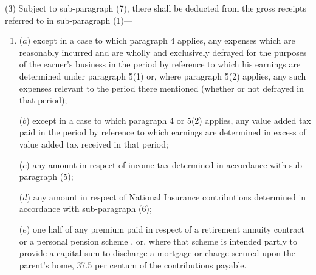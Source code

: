 \documentclass[a4paper]{article}
\begin{document}
(3) 
Subject to sub-paragraph (7), %
there shall be deducted from the gross receipts referred to in sub-paragraph (1)—
\begin{enumerate}\item[]
($a$) 
except in a case to which paragraph 4 applies, %
any expenses which are reasonably incurred and are wholly and exclusively defrayed for the purposes of the earner’s business in the period by reference to which his earnings are determined under paragraph 5(1) or, where paragraph 5(2) applies, any such expenses relevant to the period there mentioned (whether or not defrayed in that period);

($b$) 
except in a case to which paragraph 4 
  or 5(2)  %
applies, %
any value added tax paid in the period by reference to which earnings are determined in excess of value added tax received in that period;

($c$) any amount in respect of income tax determined in accordance with sub-paragraph (5);

($d$) any amount in respect of National Insurance contributions determined in accordance with sub-paragraph (6);

($e$) one half of any premium paid in respect of a retirement annuity contract or a personal pension scheme%
, or, where that scheme is intended partly to provide a capital sum to discharge a mortgage or charge secured upon the parent’s home, 37.5 per centum of the contributions payable. %
\end{enumerate}
\end{document}
